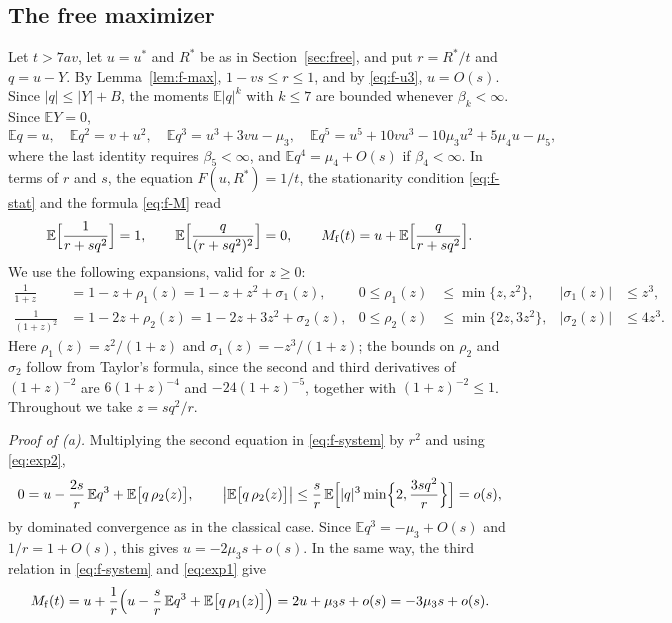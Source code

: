 \documentclass[11pt]{amsart}
\theoremstyle{definition}
\newcommand{\E}{\mathbb{E}}
\newcommand{\Mfr}{M_{\mathrm{f}}}
\begin{document}
\subsection{The free maximizer}
Let $t>7av$, let $u=u^*$ and $R^*$ be as in Section~\ref{sec:free}, and put $r=R^*/t$ and $q=u-Y$. By
Lemma~\ref{lem:f-max}, $1-vs\le r\le1$, and by \eqref{eq:f-u3}, $u=O(s)$. Since $|q|\le|Y|+B$, the moments
$\E|q|^k$ with $k\le7$ are bounded whenever $\beta_k<\infty$. Since $\E Y=0$,
\begin{equation}\label{eq:f-moments}
\E q=u,\quad \E q^2=v+u^2,\quad \E q^3=u^3+3vu-\mu_3,\quad \E q^5=u^5+10vu^3-10\mu_3u^2+5\mu_4u-\mu_5,
\end{equation}
where the last identity requires $\beta_5<\infty$, and $\E q^4=\mu_4+O(s)$ if $\beta_4<\infty$. In terms of $r$ and
$s$, the equation $F(u,R^*)=1/t$, the stationarity
condition \eqref{eq:f-stat} and the formula \eqref{eq:f-M} read
\begin{equation}\label{eq:f-system}
\E\Bigl[\frac1{r+sq^2}\Bigr]=1,\qquad \E\Bigl[\frac{q}{(r+sq^2)^2}\Bigr]=0,\qquad
\Mfr(t)=u+\E\Bigl[\frac{q}{r+sq^2}\Bigr].
\end{equation}
We use the following expansions, valid for $z\ge0$:
\begin{align}
\frac1{1+z}&=1-z+\rho_1(z)=1-z+z^2+\sigma_1(z), & 0\le\rho_1(z)&\le\min\{z,z^2\}, & |\sigma_1(z)|&\le z^3,
\label{eq:exp1}\\
\frac1{(1+z)^2}&=1-2z+\rho_2(z)=1-2z+3z^2+\sigma_2(z), & 0\le\rho_2(z)&\le\min\{2z,3z^2\}, & |\sigma_2(z)|&\le4z^3.
\label{eq:exp2}
\end{align}
Here $\rho_1(z)=z^2/(1+z)$ and $\sigma_1(z)=-z^3/(1+z)$; the bounds on $\rho_2$ and $\sigma_2$ follow from Taylor's
formula, since the second and third derivatives of $(1+z)^{-2}$ are $6(1+z)^{-4}$ and $-24(1+z)^{-5}$, together with
$(1+z)^{-2}\le1$. Throughout we take $z=sq^2/r$.

\emph{Proof of {\rm(a)}.} Multiplying the second equation in \eqref{eq:f-system} by $r^2$ and
using \eqref{eq:exp2},
\[
0=u-\frac{2s}{r}\,\E q^3+\E\bigl[q\,\rho_2(z)\bigr],\qquad
\bigl|\E\bigl[q\,\rho_2(z)\bigr]\bigr|\le\frac sr\,\E\Bigl[|q|^3\min\Bigl\{2,\frac{3sq^2}{r}\Bigr\}\Bigr]=o(s),
\]
by dominated convergence as in the classical case. Since $\E q^3=-\mu_3+O(s)$ and $1/r=1+O(s)$, this gives
$u=-2\mu_3s+o(s)$. In the same way, the third relation in \eqref{eq:f-system} and \eqref{eq:exp1} give
\[
\Mfr(t)=u+\frac1r\Bigl(u-\frac sr\,\E q^3+\E\bigl[q\,\rho_1(z)\bigr]\Bigr)=2u+\mu_3s+o(s)=-3\mu_3s+o(s).
\]
\end{document}
